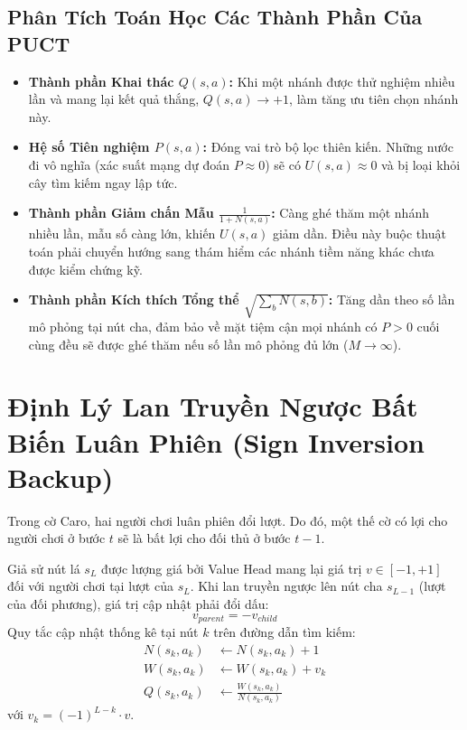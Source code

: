\documentclass[12pt,a4paper,oneside]{report}
\begin{document}
\subsection*{Phân Tích Toán Học Các Thành Phần Của PUCT}
\begin{itemize}
    \item \textbf{Thành phần Khai thác $Q(s, a)$:} Khi một nhánh được thử nghiệm nhiều lần và mang lại kết quả thắng, $Q(s, a) \to +1$, làm tăng ưu tiên chọn nhánh này.
    \item \textbf{Hệ số Tiên nghiệm $P(s, a)$:} Đóng vai trò bộ lọc thiên kiến. Những nước đi vô nghĩa (xác suất mạng dự đoán $P \approx 0$) sẽ có $U(s, a) \approx 0$ và bị loại khỏi cây tìm kiếm ngay lập tức.
    \item \textbf{Thành phần Giảm chấn Mẫu $\frac{1}{1 + N(s, a)}$:} Càng ghé thăm một nhánh nhiều lần, mẫu số càng lớn, khiến $U(s, a)$ giảm dần. Điều này buộc thuật toán phải chuyển hướng sang thám hiểm các nhánh tiềm năng khác chưa được kiểm chứng kỹ.
    \item \textbf{Thành phần Kích thích Tổng thể $\sqrt{\sum_b N(s, b)}$:} Tăng dần theo số lần mô phỏng tại nút cha, đảm bảo về mặt tiệm cận mọi nhánh có $P > 0$ cuối cùng đều sẽ được ghé thăm nếu số lần mô phỏng đủ lớn ($M \to \infty$).
\end{itemize}

\section{Định Lý Lan Truyền Ngược Bất Biến Luân Phiên (Sign Inversion Backup)}

Trong cờ Caro, hai người chơi luân phiên đổi lượt. Do đó, một thế cờ có lợi cho người chơi ở bước $t$ sẽ là bất lợi cho đối thủ ở bước $t-1$.

\begin{theorem}
Giả sử nút lá $s_L$ được lượng giá bởi Value Head mang lại giá trị $v \in [-1, +1]$ đối với người chơi tại lượt của $s_L$. Khi lan truyền ngược lên nút cha $s_{L-1}$ (lượt của đối phương), giá trị cập nhật phải đổi dấu:
\begin{equation}
    v_{parent} = - v_{child}
\end{equation}
Quy tắc cập nhật thống kê tại nút $k$ trên đường dẫn tìm kiếm:
\begin{align}
    N(s_k, a_k) &\leftarrow N(s_k, a_k) + 1\\
    W(s_k, a_k) &\leftarrow W(s_k, a_k) + v_k\\
    Q(s_k, a_k) &\leftarrow \frac{W(s_k, a_k)}{N(s_k, a_k)}
\end{align}
với $v_k = (-1)^{L - k} \cdot v$.
\end{theorem}
\end{document}

